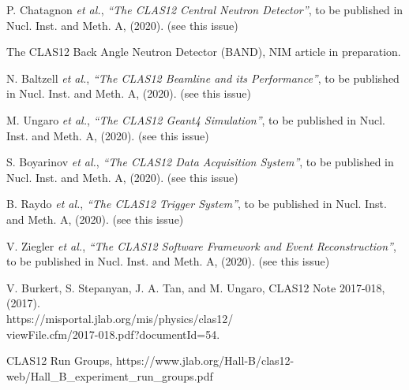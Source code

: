 \documentclass[final,3p]{elsarticle}
\begin{document}
\begin{twocolumn}
\begin{thebibliography}{99}
P. Chatagnon {\it et al.}, {\it ``The CLAS12 Central Neutron Detector''}, to be published in Nucl. Inst.
and Meth. A, (2020). (see this issue)

The CLAS12 Back Angle Neutron Detector (BAND), NIM article in preparation. 

N. Baltzell {\it et al.}, {\it ``The CLAS12 Beamline and its Performance''}, to be published in Nucl. Inst.
and Meth. A, (2020). (see this issue)

M. Ungaro {\it et al.}, {\it ``The CLAS12 Geant4 Simulation''}, to be published in Nucl. Inst.
and Meth. A, (2020). (see this issue)

S. Boyarinov {\it et al.}, {\it ``The CLAS12 Data Acquisition System''}, to be published in Nucl. Inst.
and Meth. A, (2020). (see this issue)

B. Raydo {\it et al.}, {\it ``The CLAS12 Trigger System''}, to be published in Nucl. Inst. and Meth. A, (2020).
(see this issue)

V. Ziegler {\it et al.}, {\it ``The CLAS12 Software Framework and Event Reconstruction''}, to be published in
  Nucl. Inst. and Meth. A, (2020). (see this issue)

 V. Burkert, S. Stepanyan, J. A. Tan, and M. Ungaro, CLAS12 Note 2017-018, (2017).\\ 
  https://misportal.jlab.org/mis/physics/clas12/\\ viewFile.cfm/2017-018.pdf?documentId=54. 

CLAS12 Run Groups, https://www.jlab.org/Hall-B/clas12-web/Hall\_B\_experiment\_run\_groups.pdf

\end{thebibliography}

\end{twocolumn}
\end{document}
